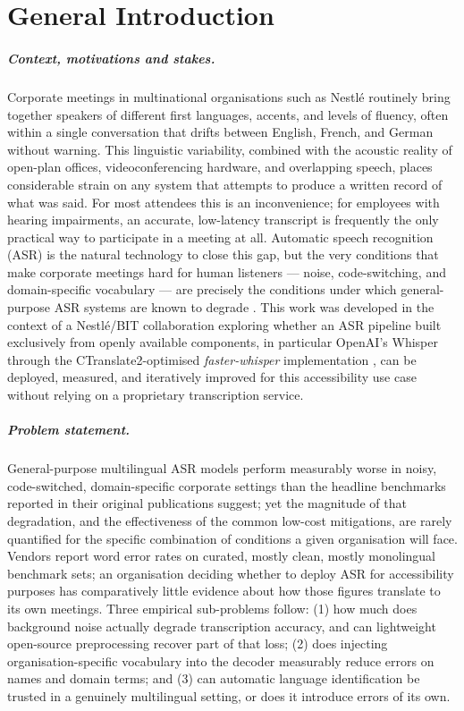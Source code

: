 \documentclass[12pt]{report}
\begin{document}
\chapter*{General Introduction}
\thispagestyle{fancy}
\setcounter{page}{1}
\paragraph{Context, motivations and stakes.}
Corporate meetings in multinational organisations such as Nestlé routinely bring together speakers of different first languages, accents, and levels of fluency, often within a single conversation that drifts between English, French, and German without warning. This linguistic variability, combined with the acoustic reality of open-plan offices, videoconferencing hardware, and overlapping speech, places considerable strain on any system that attempts to produce a written record of what was said. For most attendees this is an inconvenience; for employees with hearing impairments, an accurate, low-latency transcript is frequently the only practical way to participate in a meeting at all. Automatic speech recognition (ASR) is the natural technology to close this gap, but the very conditions that make corporate meetings hard for human listeners --- noise, code-switching, and domain-specific vocabulary --- are precisely the conditions under which general-purpose ASR systems are known to degrade \cite{radford2023robust,baevski2020wav2vec}. This work was developed in the context of a Nestlé/BIT collaboration exploring whether an ASR pipeline built exclusively from openly available components, in particular OpenAI's Whisper through the CTranslate2-optimised \textit{faster-whisper} implementation \cite{fasterwhisper2023}, can be deployed, measured, and iteratively improved for this accessibility use case without relying on a proprietary transcription service.
\paragraph{Problem statement.}
General-purpose multilingual ASR models perform measurably worse in noisy, code-switched, domain-specific corporate settings than the headline benchmarks reported in their original publications suggest; yet the magnitude of that degradation, and the effectiveness of the common low-cost mitigations, are rarely quantified for the specific combination of conditions a given organisation will face. Vendors report word error rates on curated, mostly clean, mostly monolingual benchmark sets; an organisation deciding whether to deploy ASR for accessibility purposes has comparatively little evidence about how those figures translate to its own meetings. Three empirical sub-problems follow: (1) how much does background noise actually degrade transcription accuracy, and can lightweight open-source preprocessing recover part of that loss; (2) does injecting organisation-specific vocabulary into the decoder measurably reduce errors on names and domain terms; and (3) can automatic language identification be trusted in a genuinely multilingual setting, or does it introduce errors of its own.
\end{document}
